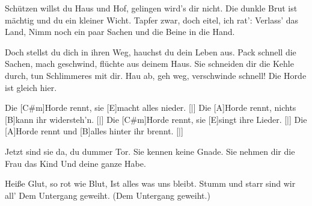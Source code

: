 \begin{guitar}
	
	Schützen willst du Haus und Hof, gelingen wird's dir nicht.
	Die dunkle Brut ist mächtig und du ein kleiner Wicht.
	Tapfer zwar, doch eitel, ich rat': Verlass' das Land,
	Nimm noch ein paar Sachen und die Beine in die Hand.
	
	Doch stellst du dich in ihren Weg, hauchst du dein Leben aus.
	Pack schnell die Sachen, mach geschwind, flüchte aus deinem Haus.
	Sie schneiden dir die Kehle durch, tun Schlimmeres mit dir.
	Hau ab, geh weg, verschwinde schnell! Die Horde ist gleich hier.
	
	Die [C#m]Horde rennt, sie [E]macht alles nieder.		\hfill [|]{}
	Die [A]Horde rennt, nichts [B]kann ihr widersteh'n.		\hfill [|]{}
	Die [C#m]Horde rennt, sie [E]singt ihre Lieder.			\hfill [|]{}
	Die [A]Horde rennt und [B]alles hinter ihr brennt.		\hfill [|]{}
	
	
	Jetzt sind sie da, du dummer Tor.
	Sie kennen keine Gnade.
	Sie nehmen dir die Frau das Kind
	Und deine ganze Habe.
	
	Heiße Glut, so rot wie Blut,
	Ist alles was uns bleibt.
	Stumm und starr sind wir all'
	Dem Untergang geweiht. (Dem Untergang geweiht.)
	
	 
	
\end{guitar}
